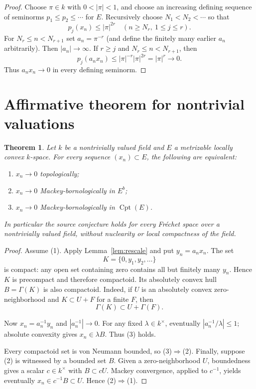 \documentclass[11pt]{article}
\newtheorem{theorem}{Theorem}
\newcommand{\Cpt}{\operatorname{Cpt}}
\newcommand{\Ga}{\Gamma}
\begin{document}
\begin{proof}
Choose $\pi\in k$ with $0<|\pi|<1$, and choose an increasing defining sequence of seminorms $p_1\leq p_2\leq\cdots$ for $E$.  Recursively choose
$N_1<N_2<\cdots$ so that
\[
 p_j(x_n)\leq |\pi|^{2r}
 \quad(n\geq N_r,\ 1\leq j\leq r).
\]
For $N_r\leq n<N_{r+1}$ set $a_n=\pi^{-r}$ (and define the finitely many earlier $a_n$ arbitrarily).  Then $|a_n|\to\infty$.  If $r\geq j$ and $N_r\leq n<N_{r+1}$, then
\[
 p_j(a_nx_n)\leq|\pi|^{-r}|\pi|^{2r}=|\pi|^r\longrightarrow0.
\]
Thus $a_nx_n\to0$ in every defining seminorm.
\end{proof}

\section*{Affirmative theorem for nontrivial valuations}

\begin{theorem}\label{thm:positive}
Let $k$ be a nontrivially valued field and $E$ a metrizable locally convex $k$-space.  For every sequence $(x_n)\subset E$, the following are equivalent:
\begin{enumerate}[label=(\arabic*),leftmargin=2em]
\item $x_n\to0$ topologically;
\item $x_n\to0$ Mackey-bornologically in $E^b$;
\item $x_n\to0$ Mackey-bornologically in $\Cpt(E)$.
\end{enumerate}
In particular the source conjecture holds for every Fr\'echet space over a nontrivially valued field, without nuclearity or local compactness of the field.
\end{theorem}

\begin{proof}
Assume (1).  Apply Lemma~\ref{lem:rescale} and put $y_n=a_nx_n$.  The set
\[
 K=\{0,y_1,y_2,\ldots\}
\]
is compact: any open set containing zero contains all but finitely many $y_n$.  Hence $K$ is precompact and therefore compactoid.  Its absolutely convex hull
$B=\Ga(K)$ is also compactoid.  Indeed, if $U$ is an absolutely convex zero-neighborhood and
$K\subset U+F$ for a finite $F$, then
\[
 \Ga(K)\subset U+\Ga(F).
\]

Now $x_n=a_n^{-1}y_n$ and $|a_n^{-1}|\to0$.  For any fixed
$\lambda\in k^\times$, eventually $|a_n^{-1}/\lambda|\leq1$; absolute convexity gives $x_n\in\lambda B$.  Thus (3) holds.

Every compactoid set is von Neumann bounded, so (3)$\Rightarrow$(2).  Finally, suppose (2) is witnessed by a bounded set $B$.  Given a zero-neighborhood $U$, boundedness gives a scalar $c\in k^\times$ with $B\subset cU$.  Mackey convergence, applied to $c^{-1}$, yields eventually
$x_n\in c^{-1}B\subset U$.  Hence (2)$\Rightarrow$(1).
\end{proof}
\end{document}
